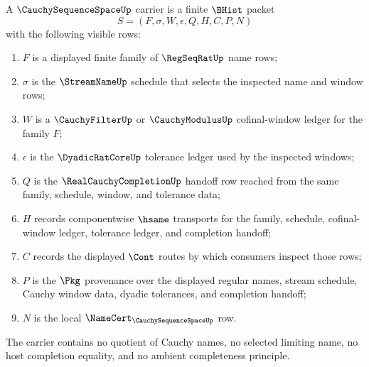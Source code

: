 \begin{definition}
\label{def:cauchysequence-space-carrier-surface}
A $\CauchySequenceSpaceUp$ carrier is a finite $\BHist$ packet
$$
S=(F,\sigma,W,\epsilon,Q,H,C,P,N)
$$
with the following visible rows:
\begin{enumerate}
\item $F$ is a displayed finite family of $\RegSeqRatUp$ name rows;
\item $\sigma$ is the $\StreamNameUp$ schedule that selects the inspected name and window rows;
\item $W$ is a $\CauchyFilterUp$ or $\CauchyModulusUp$ cofinal-window ledger for the family $F$;
\item $\epsilon$ is the $\DyadicRatCoreUp$ tolerance ledger used by the inspected windows;
\item $Q$ is the $\RealCauchyCompletionUp$ handoff row reached from the same family, schedule, window, and tolerance data;
\item $H$ records componentwise $\hsame$ transports for the family, schedule, cofinal-window ledger, tolerance ledger, and completion handoff;
\item $C$ records the displayed $\Cont$ routes by which consumers inspect those rows;
\item $P$ is the $\Pkg$ provenance over the displayed regular names, stream schedule, Cauchy window data, dyadic tolerances, and completion handoff;
\item $N$ is the local $\NameCert_{\CauchySequenceSpaceUp}$ row.
\end{enumerate}
The carrier contains no quotient of Cauchy names, no selected limiting name, no host completion equality, and no ambient completeness principle.
\end{definition}


